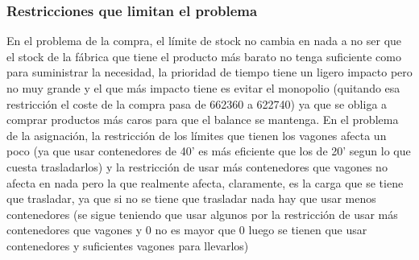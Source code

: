\documentclass[11pt,spanish]{article}
\begin{document}
			\subsubsection{Restricciones que limitan el problema}
			En el problema de la compra, el límite de stock no cambia en nada a no ser que el stock de la fábrica que tiene el producto más barato no tenga suficiente como para suministrar la necesidad, la prioridad de tiempo tiene un ligero impacto pero no muy grande y el que más impacto tiene es evitar el monopolio (quitando esa restricción el coste de la compra pasa de 662360 a 622740) ya que se obliga a comprar productos más caros para que el balance se mantenga.
			En el problema de la asignación, la restricción de los límites que tienen los vagones afecta un poco (ya que usar contenedores de 40' es más eficiente que los de 20' segun lo que cuesta trasladarlos) y la restricción de usar más contenedores que vagones no afecta en nada pero la que realmente afecta, claramente, es la carga que se tiene que trasladar, ya que si no se tiene que trasladar nada hay que usar menos contenedores (se sigue teniendo que usar algunos por la restricción de usar más contenedores que vagones y 0 no es mayor que 0 luego se tienen que usar contenedores y suficientes vagones para llevarlos)
\end{document}
